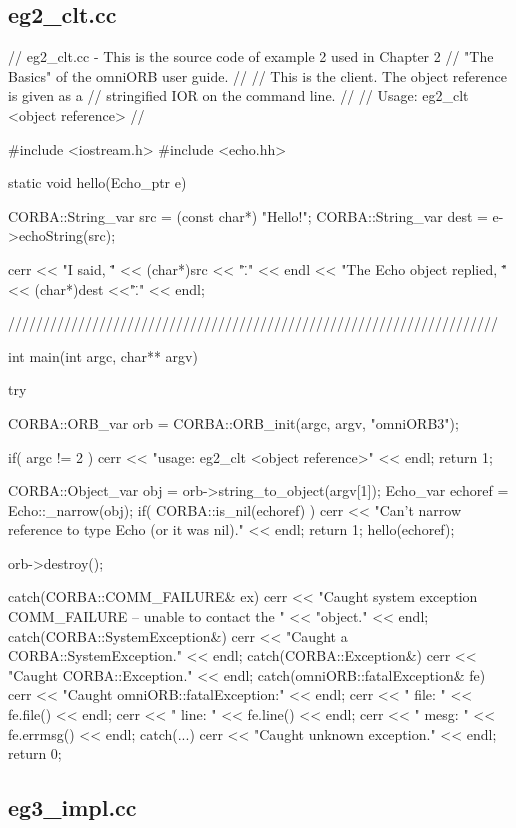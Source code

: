 \documentclass[11pt,twoside,a4paper]{book}
\begin{document}
\clearpage
\subsection{eg2\_clt.cc}

\begin{cxxlisting}
// eg2_clt.cc - This is the source code of example 2 used in Chapter 2
//              "The Basics" of the omniORB user guide.
//
//              This is the client. The object reference is given as a
//              stringified IOR on the command line.
//
// Usage: eg2_clt <object reference>
//

#include <iostream.h>
#include <echo.hh>

static void hello(Echo_ptr e)
{
  CORBA::String_var src  = (const char*) "Hello!";
  CORBA::String_var dest = e->echoString(src);

  cerr << "I said, \"" << (char*)src << "\"." << endl
       << "The Echo object replied, \"" << (char*)dest <<"\"." << endl;
}

//////////////////////////////////////////////////////////////////////

int main(int argc, char** argv)
{
  try {
    CORBA::ORB_var orb = CORBA::ORB_init(argc, argv, "omniORB3");

    if( argc != 2 ) {
      cerr << "usage:  eg2_clt <object reference>" << endl;
      return 1;
    }

    CORBA::Object_var obj = orb->string_to_object(argv[1]);
    Echo_var echoref = Echo::_narrow(obj);
    if( CORBA::is_nil(echoref) ) {
      cerr << "Can't narrow reference to type Echo (or it was nil)." << endl;
      return 1;
    }
    hello(echoref);

    orb->destroy();
  }
  catch(CORBA::COMM_FAILURE& ex) {
    cerr << "Caught system exception COMM_FAILURE -- unable to contact the "
         << "object." << endl;
  }
  catch(CORBA::SystemException&) {
    cerr << "Caught a CORBA::SystemException." << endl;
  }
  catch(CORBA::Exception&) {
    cerr << "Caught CORBA::Exception." << endl;
  }
  catch(omniORB::fatalException& fe) {
    cerr << "Caught omniORB::fatalException:" << endl;
    cerr << "  file: " << fe.file() << endl;
    cerr << "  line: " << fe.line() << endl;
    cerr << "  mesg: " << fe.errmsg() << endl;
  }
  catch(...) {
    cerr << "Caught unknown exception." << endl;
  }
  return 0;
}
\end{cxxlisting}


\clearpage
\subsection{eg3\_impl.cc}
\end{document}
